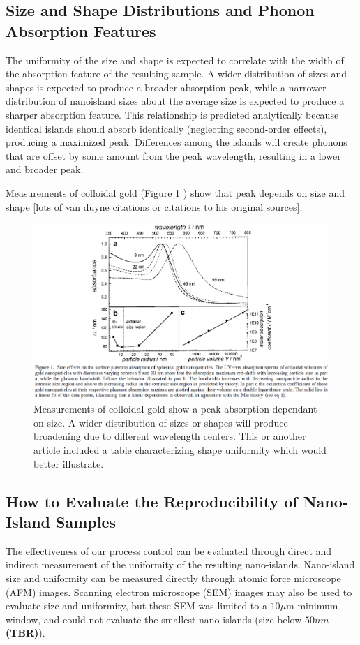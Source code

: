 \documentclass[12pt,oneside,english]{article}
\begin{document}
    \subsection{Size and Shape Distributions and Phonon Absorption Features}
    The uniformity of the size and shape is expected to correlate with the width of the absorption feature of the resulting sample.
    A wider distribution of sizes and shapes is expected to produce a broader absorption peak, while a narrower distribution of nanoisland sizes about the average size is expected to produce a sharper absorption feature.
    This relationship is predicted analytically because identical islands should absorb identically (neglecting second-order effects), producing a maximized peak.  
    Differences among the islands will create phonons that are offset by some amount from the peak wavelength, resulting in a lower and broader peak.

    Measurements of colloidal gold (Figure \ref{f:link99} \cite{link99}) show that peak depends on size and shape [lots of van duyne citations or citations to his original sources].
    
    \begin{figure}
        \includegraphics[width=150mm]{images/link99.eps}
        \caption{Measurements of colloidal gold show a peak absorption dependant on size.  A wider distribution of sizes or shapes will produce broadening due to different wavelength centers.  This or another article included a table characterizing shape uniformity which would better illustrate.}
        \label{f:link99}
    \end{figure}
        

    \subsection{How to Evaluate the Reproducibility of Nano-Island Samples}
    The effectiveness of our process control can be evaluated through direct and indirect measurement of the uniformity of the resulting nano-islands.  
    Nano-island size and uniformity can be measured directly through atomic force microscope (AFM) images.  
    Scanning electron microscope (SEM) images may also be used to evaluate size and uniformity, but these SEM was limited to a $10\mu$m minimum window, and could not evaluate the smallest nano-islands (size below {\bf $50nm$ (TBR)}).  
    
\end{document}
